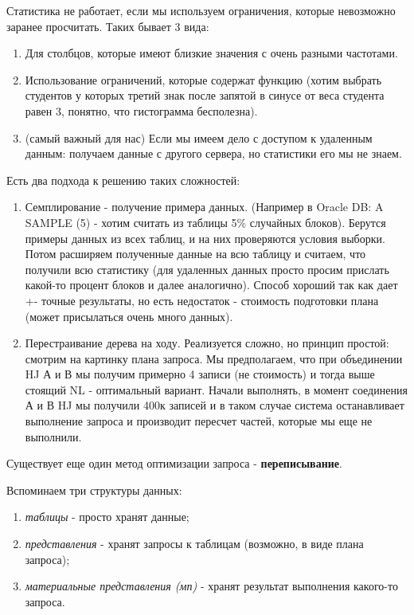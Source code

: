 \begin{itemize}
Статистика не работает, если мы используем ограничения, которые невозможно заранее просчитать. Таких бывает 3 вида: 
\begin{enumerate}
    \item Для столбцов, которые имеют близкие значения с очень разными частотами.
    \item Использование ограничений, которые содержат функцию (хотим выбрать студентов у которых третий знак после запятой в синусе от веса студента равен 3, понятно, что гистограмма бесполезна).
    \item (самый важный для нас) Если мы имеем дело с доступом к удаленным данным: получаем данные с другого сервера, но статистики его мы не знаем.
\end{enumerate}

Есть два подхода к решению таких сложностей: 

\begin{enumerate}
    \item Семплирование - получение примера данных. (Например в Oracle DB: A SAMPLE (5) - хотим считать из таблицы 5\% случайных блоков). Берутся примеры данных из всех таблиц, и на них проверяются условия выборки. Потом расширяем полученные данные на всю таблицу и считаем, что получили всю статистику (для удаленных данных просто просим прислать какой-то процент блоков и далее аналогично). Способ хороший так как дает +- точные результаты, но есть недостаток - стоимость подготовки плана (может присылаться очень много данных).
    \item Перестраивание дерева на ходу. Реализуется сложно, но принцип простой:  смотрим на картинку плана запроса. Мы предполагаем, что при объединении HJ А и В мы получим примерно 4 записи (не стоимость) и тогда выше стоящий NL - оптимальный вариант. Начали выполнять, в момент соединения А и В HJ мы получили 400к записей и в таком случае система останавливает выполнение запроса и производит пересчет частей, которые мы еще не выполнили.
\end{enumerate}
\end{itemize}

Существует еще один метод оптимизации запроса - \textbf{переписывание}. 

Вспоминаем три структуры данных: 

\begin{enumerate}
    \item \textit{таблицы} - просто хранят данные;
    \item  \textit{представления} - хранят запросы к таблицам (возможно, в виде плана запроса);
    \item \textit{материальные представления (мп)} - хранят результат выполнения какого-то запроса. 
\end{enumerate}

